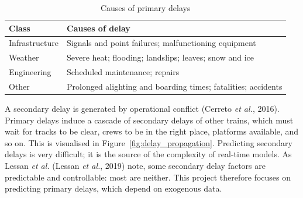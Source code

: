 \documentclass[12pt,a4paper]{article}
\begin{document}
\begin{table}[]
\centering
\caption{Causes of primary delays}
\label{table:primary_delay}
\begin{tabular}{|l|l|}
\hline
\textbf{Class} & \textbf{Causes of delay}                                      \\ \hline
Infrastructure & Signals and point failures; malfunctioning equipment          \\ \hline
Weather        & Severe heat; flooding; landslips; leaves; snow and ice        \\ \hline
Engineering    & Scheduled maintenance; repairs                                \\ \hline
Other          & Prolonged alighting and boarding times; fatalities; accidents \\ \hline
\end{tabular}
\end{table}

A secondary delay is generated by operational conflict (Cerreto \textit{et al.}, 2016). Primary delays induce a cascade of secondary delays of other trains, which must wait for tracks to be clear, crews to be in the right place, platforms available, and so on. This is visualised in Figure~\ref{fig:delay_propagation}. Predicting secondary delays is very difficult; it is the source of the complexity of real-time models. As Lessan \textit{et al.} (Lessan \textit{et al.}, 2019) note, some secondary delay factors are predictable and controllable: most are neither. This project therefore focuses on predicting primary delays, which depend on exogenous data. 
\end{document}
